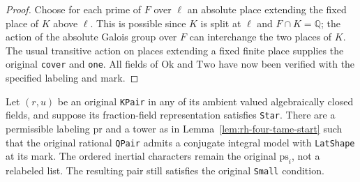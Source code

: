 \begin{proof}
Choose for each prime of $F$ over $\ell$ an absolute
place extending the fixed place of $K$ above $\ell$.
This is possible since $K$ is split at $\ell$ and
$F\cap K=\mathbb Q$; the action of the absolute Galois
group over $F$ can interchange the two places of $K$.
The usual transitive action on places extending a fixed
finite place supplies the original \texttt{cover} and
\texttt{one}. All fields of $\mathrm{Ok}$ and
$\mathrm{Two}$ have now been verified with the specified
labeling and mark.
\end{proof}

\begin{theorem}
\label{thm:rh-four-lat-shape}
Let $(r,u)$ be an original \texttt{KPair} in any of its
ambient valued algebraically closed fields, and suppose its
fraction-field representation satisfies \texttt{Star}.
There are a permissible labeling $\mathrm{pr}$ and a
tower as in Lemma~\ref{lem:rh-four-tame-start} such that the
original rational \texttt{QPair} admits a conjugate integral
model with \texttt{LatShape} at its mark. The ordered
inertial characters remain the original $\mathrm{ps}_i$,
not a relabeled list. The resulting pair still satisfies
the original \texttt{Small} condition.
\end{theorem}

